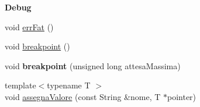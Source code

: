\begin{Indent}\textbf{ Debug}\par
\begin{DoxyCompactItemize}
\item 
void \hyperlink{class_debug_abe97a56741964a962add2db1e82731ad}{err\+Fat} ()
\item 
void \hyperlink{class_debug_a3a24898e3ca48ef89e2029ab6e43665c}{breakpoint} ()
\item 
\mbox{\label{class_debug_a45658982ed89107a443e032a951acb83}} 
void {\bfseries breakpoint} (unsigned long attesa\+Massima)
\item 
{\footnotesize template$<$typename T $>$ }\\void \hyperlink{class_debug_aab7b40f35a2ea8070848b650f8d0bbbe}{assegna\+Valore} (const String \&nome, T $\ast$pointer)
\end{DoxyCompactItemize}
\end{Indent}
